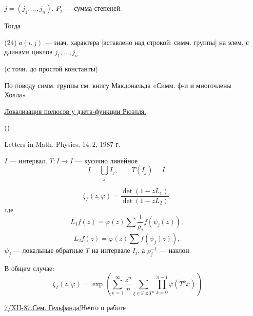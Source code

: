 $j=(j_1,\ldots,j_n)$, $P_j$ — сумма степеней.

Тогда

(24) $a(i,j)$ — знач. характера [вставлено над строкой: симм. группы]
на элем. с длинами циклов $j_1,\ldots,j_n$

(с точн. до простой константы)

По поводу симм. группы см. книгу Макдональда «Симм. ф-и
и многочлены Холла».

\medskip
\underline{Локализация полюсов у дзета-функции Рюэлля.}

()

Letters in Math. Physics, $14:2$, 1987 г.

$I$ — интервал, $T:I\to I$ — кусочно линейное
\begin{equation*}
 I=\bigcup_j I_j,\qquad T(I_j)=I.
\end{equation*}



\begin{equation}
 \zeta_T(z,\varphi)=\frac{\det(1-zL_1)}{\det(1-zL_2)},
 \tag{1}
\end{equation}
где
\begin{equation*}
 L_1f(z)=\varphi(z)\sum\frac{1}{\rho_j}f(\psi_j(z)),
\end{equation*}
\begin{equation*}
 L_2f(z)=\varphi(z)\sum f(\psi_j(z)),
\end{equation*}
$\psi_j$ — локальные обратные $T$ на интервале $I_j$, а $\rho_j^{-1}$ — наклон.

В общем случае:
\begin{equation}
 \zeta_T(z,\varphi)=
 \exp\left(
 \sum_{n=1}^{\infty}\frac{z^n}{n}
 \sum_{\xi\in\mathrm{Fix}\,T^n}
 \prod_{k=0}^{n-1}\varphi(T^k x)
 \right)
 \tag{2}
\end{equation}


\underline{7/XII-87.}\qquad \underline{Сем. Гельфанда!}\qquad Нечто о работе

